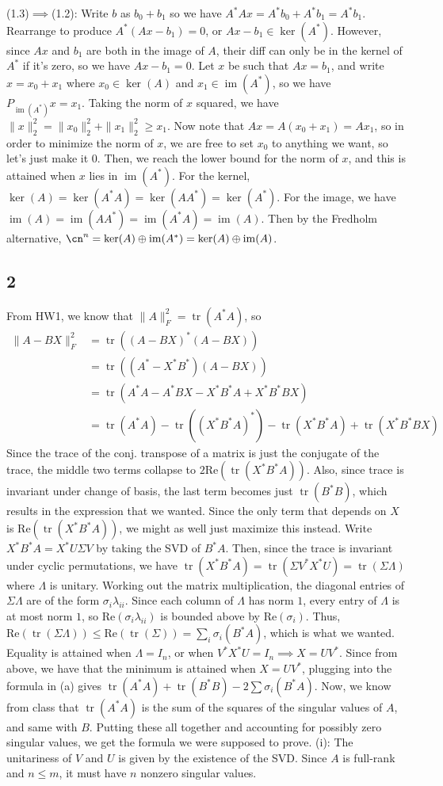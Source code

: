 \documentclass{article}
\DeclareMathOperator{\im}{im}
\DeclareMathOperator{\tr}{tr}
\renewcommand{\Re}{\mathrm{Re}}
\begin{document}
(1.3)$\implies$(1.2): Write $b$ as $b_0+b_1$ so we have $A^*Ax=A^*b_0+A^*b_1=A^*b_1$. Rearrange to produce $A^*(Ax-b_1)=0$, or $Ax-b_1\in\ker(A^*)$. However, since $Ax$ and $b_1$ are both in the image of $A$, their diff can only be in the kernel of $A^*$ if it's zero, so we have $Ax-b_1=0$.
Let $x$ be such that $Ax=b_1$, and write $x=x_0+x_1$ where $x_0\in\ker(A)$ and $x_1\in\im(A^*)$, so we have $P_{\im(A^*)}x=x_1$. Taking the norm of $x$ squared, we have $\|x\|_2^2=\|x_0\|_2^2+\|x_1\|_2^2\geq x_1$. Now note that $Ax=A(x_0+x_1)=Ax_1$, so in order to minimize the norm of $x$, we are free to set $x_0$ to anything we want, so let's just make it $0$. Then, we reach the lower bound for the norm of $x$, and this is attained when $x$ lies in $\im(A^*)$. 
For the kernel, $\ker(A)=\ker(A^*A)=\ker(AA^*)=\ker(A^*)$. For the image, we have $\im(A)=\im(AA^*)=\im(A^*A)=\im(A)$. Then by the Fredholm alternative, $\cn^n=\ker(A)\oplus\im(A^*)=\ker(A)\oplus\im(A)$. 
\subsection*{2}
From HW1, we know that $\|A\|_F^2=\tr(A^*A)$, so 
\begin{align*}
    \|A-BX\|_F^2&=\tr((A-BX)^*(A-BX))\\
    &=\tr((A^*-X^*B^*)(A-BX))&\\
    &=\tr(A^*A-A^*BX-X^*B^*A+X^*B^*BX)\\
    &=\tr(A^*A)-\tr((X^*B^*A)^*)-\tr(X^*B^*A)+\tr(X^*B^*BX)
\end{align*}
Since the trace of the conj. transpose of a matrix is just the conjugate of the trace, the middle two terms collapse to $2\Re(\tr(X^*B^*A))$. Also, since trace is invariant under change of basis, the last term becomes just $\tr(B^*B)$, which results in the expression that we wanted. Since the only term that depends on $X$ is $\Re(\tr(X^*B^*A))$, we might as well just maximize this instead.
Write $X^*B^*A=X^*U\Sigma V$ by taking the SVD of $B^*A$. Then, since the trace is invariant under cyclic permutations, we have $\tr(X^*B^*A)=\tr(\Sigma V^*X^*U)=\tr(\Sigma\Lambda)$ where $\Lambda$ is unitary. Working out the matrix multiplication, the diagonal entries of $\Sigma\Lambda$ are of the form $\sigma_i\lambda_{ii}$. Since each column of $\Lambda$ has norm $1$, every entry of $\Lambda$ is at most norm $1$, so $\Re(\sigma_i\lambda_{ii})$ is bounded above by $\Re(\sigma_i)$. Thus, $\Re(\tr(\Sigma\Lambda))\leq\Re(\tr(\Sigma))=\sum_i\sigma_i(B^*A)$, which is what we wanted. Equality is attained when $\Lambda=I_n$, or when $V^*X^*U=I_n\implies X=UV^*$. 
Since from above, we have that the minimum is attained when $X=UV^*$, plugging into the formula in (a) gives $\tr(A^*A)+\tr(B^*B)-2\sum\sigma_i(B^*A)$. Now, we know from class that $\tr(A^*A)$ is the sum of the squares of the singular values of $A$, and same with $B$. Putting these all together and accounting for possibly zero singular values, we get the formula we were supposed to prove.
(i): The unitariness of $V$ and $U$ is given by the existence of the SVD. Since $A$ is full-rank and $n\leq m$, it must have $n$ nonzero singular values.
\end{document}
